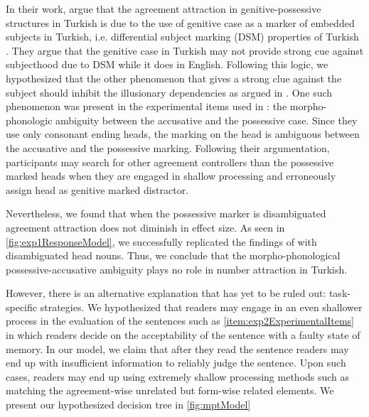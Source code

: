 \documentclass[doc,a4paper,man,natbib,floatsintext,noextraspace]{apa6}\usepackage[]{graphicx}\usepackage[]{color}
\begin{document}
In their work, \citet{LagoEtAl:2018} argue that the agreement attraction in genitive-possessive structures in Turkish is due to the use of genitive case as a marker of embedded subjects in Turkish, i.e. differential subject marking (DSM) properties of Turkish \citep{kornfilt2009dom}. They argue that the genitive case in Turkish may not provide strong cue against subjecthood due to DSM while it does in English. Following this logic, we hypothesized that the other phenomenon that gives a strong clue against the subject should inhibit the illusionary dependencies as argued in \citet{nicol2016minimal}. One such phenomenon was present in the experimental items used in \citet{LagoEtAl:2018}: the morpho-phonologic ambiguity between the accusative and the possessive case. Since they use only consonant ending heads, the marking on the head is ambiguous between the accusative and the possessive marking. Following their argumentation, participants may search for other agreement controllers than the possessive marked heads when they are engaged in shallow processing and erroneously assign head as genitive marked distractor.

Nevertheless, we found that when the possessive marker is disambiguated agreement attraction does not diminish in effect size. As seen in \autoref{fig:exp1ResponseModel}, we successfully replicated the findings of \citet{LagoEtAl:2018} with disambiguated head nouns. Thus, we conclude that the morpho-phonological possessive-accusative ambiguity plays no role in number attraction in Turkish.


However, there is an alternative explanation that has yet to be ruled out: task-specific strategies. We hypothesized that readers may engage in an even shallower process in the evaluation of the sentences such as \ref{item:exp2ExperimentalItems} in which readers decide on the acceptability of the sentence with a faulty state of memory. In our model, we claim that after they read the sentence readers may end up with insufficient information to reliably judge the sentence. Upon such cases, readers may end up using extremely shallow processing methods such as matching the agreement-wise unrelated but form-wise related elements. %
We present our hypothesized decision tree in \autoref{fig:mptModel}
\end{document}
